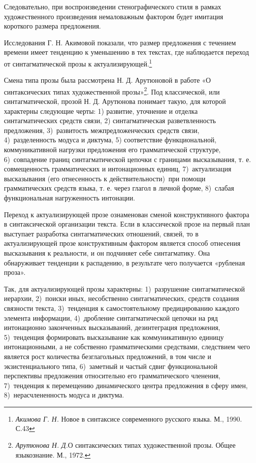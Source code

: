 \documentclass{kursa4}
\begin{document}
{      Следовательно, при воспроизведении стенографического стиля в рамках
      художественного произведения немаловажным фактором будет имитация
      короткого размера предложения. 

      Исследования Г. Н. Акимовой показали, что размер предложения с
      течением времени имеет тенденцию к уменьшению в тех текстах, где
      наблюдается переход от синтагматической прозы к
      актуализирующей.\footnote{\textit{Акимова Г. Н.} Новое в синтаксисе современного русского языка. М., 1990. С.43} 

      Смена типа прозы была рассмотрена Н. Д. Арутюновой в работе «О синтаксических типах художественной прозы»\footnote{\textit{Арутюнова Н. Д.}О синтаксических типах художественной прозы. Общее языкознание. М., 1972.}. Под классической, или синтагматической, прозой Н. Д. Арутюнова
      понимает такую, для которой характерны следующие черты:
      1) развитие, уточнение и отделка синтагматических средств связи, 2)
      синтагматическая разветвленность предложения, 3)~развитость
      межпредложенческих средств связи, 4)~разделенность модуса и диктума, 5)
      соответствие функциональной, коммуникативной нагрузки предложения его
      грамматической структуре, 6)~совпадение границ синтагматической цепочки
      с границами высказывания, т. е. совмещенность грамматических и
      интонационных единиц, 7)~актуализация высказывания (его отнесенность к
      действительности)~при помощи грамматических средств языка, т. е. через
      глагол в личной форме, 8)~слабая функциональная нагруженность
      интонации.

      Переход к актуализирующей прозе ознаменован сменой конструктивного
      фактора в синтаксической организации текста. Если в классической прозе
      на первый план выступает разработка синтагматических отношений, связей,
      то в актуализирующей прозе конструктивным фактором является способ
      отнесения высказывания к реальности, и он подчиняет себе синтагматику.
      Она обнаруживает тенденции к распадению, в результате чего получается
      «рубленая проза». 

      Так, для актуализирующей прозы характерны:
      1)~разрушение синтагматической иерархии, 2)~поиски иных, несобственно
      синтагматических, средств создания связности текста, 3)~тенденция к
      самостоятельному предицированию каждого элемента информации, 4)~дробление синтагматической цепочки на ряд интонационно законченных
      высказываний, дезинтеграция предложения, 5)~тенденция формировать
      высказывание как коммуникативную единицу интонационными, а не
      собственно грамматическими средствами, следствием чего является рост
      количества безглагольных предложений, в том числе и экзистенциального
      типа, 6)~заметный и частый сдвиг функциональной перспективы предложения
      относительно его грамматического членения, 7)~тенденция к перемещению
      динамического центра предложения в сферу имен, 8)~нерасчлененность
      модуса и диктума.

}
\end{document}
